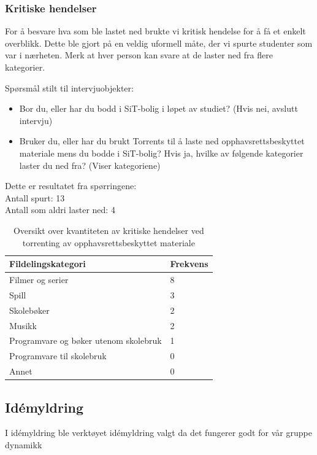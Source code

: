 \subsubsection{Kritiske hendelser}
For å besvare hva som ble lastet ned brukte vi kritisk hendelse for å få et enkelt overblikk. Dette ble gjort på en veldig uformell måte, der vi spurte studenter som var i nærheten. Merk at hver person kan svare at de laster ned fra flere kategorier.


Spørsmål stilt til intervjuobjekter:
\begin{itemize}
    \item Bor du, eller har du bodd i SiT-bolig i løpet av studiet? (Hvis nei, avslutt intervju)
    \item Bruker du, eller har du brukt Torrents til å laste ned opphavsrettsbeskyttet materiale mens du bodde i SiT-bolig? Hvis ja, hvilke av følgende kategorier laster du ned fra? (Viser kategoriene)
\end{itemize}

\noindent Dette er resultatet fra spørringene: \\
\indent Antall spurt: 13 \\
\indent Antall som aldri laster ned: 4
\begin{table} [H]
    \begin{tabular}{ | m{20em} | m{20em} | }
        \hline
            \cellcolor{yellow} Fildelingskategori & \cellcolor{yellow} Frekvens \\
        \hline
            Filmer og serier & 8  \\
        \hline
            Spill & 3 \\
        \hline
            Skolebøker & 2 \\
        \hline
            Musikk & 2 \\
        \hline
            Programvare og bøker utenom skolebruk & 1 \\
        \hline
            Programvare til skolebruk & 0 \\
        \hline
            Annet & 0 \\
        \hline
    \end{tabular}
    \caption{Oversikt over kvantiteten av kritiske hendelser ved torrenting av opphavsrettsbeskyttet materiale}
    \label{kritisk_tabell_1}
\end{table}


\subsection{Idémyldring}
I idémyldring ble verktøyet idémyldring valgt da det fungerer godt for vår gruppe dynamikk 
